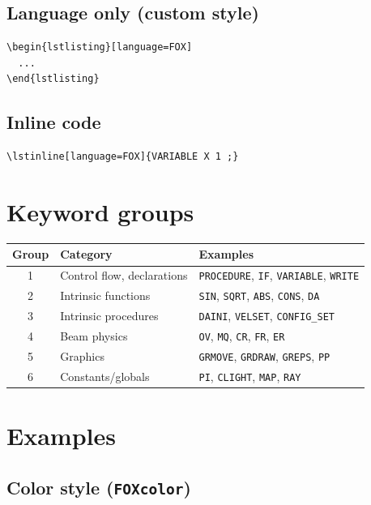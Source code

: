 \documentclass{article}
\begin{document}
\subsection{Language only (custom style)}

\begin{verbatim}
\begin{lstlisting}[language=FOX]
  ...
\end{lstlisting}
\end{verbatim}

\subsection{Inline code}

\begin{verbatim}
\lstinline[language=FOX]{VARIABLE X 1 ;}
\end{verbatim}

\section{Keyword groups}

\begin{tabular}{cll}
\toprule
Group & Category & Examples \\
\midrule
1 & Control flow, declarations & \texttt{PROCEDURE}, \texttt{IF}, \texttt{VARIABLE}, \texttt{WRITE} \\
2 & Intrinsic functions & \texttt{SIN}, \texttt{SQRT}, \texttt{ABS}, \texttt{CONS}, \texttt{DA} \\
3 & Intrinsic procedures & \texttt{DAINI}, \texttt{VELSET}, \texttt{CONFIG\_SET} \\
4 & Beam physics & \texttt{OV}, \texttt{MQ}, \texttt{CR}, \texttt{FR}, \texttt{ER} \\
5 & Graphics & \texttt{GRMOVE}, \texttt{GRDRAW}, \texttt{GREPS}, \texttt{PP} \\
6 & Constants/globals & \texttt{PI}, \texttt{CLIGHT}, \texttt{MAP}, \texttt{RAY} \\
\bottomrule
\end{tabular}

\section{Examples}

\subsection{Color style (\texttt{FOXcolor})}
\end{document}
